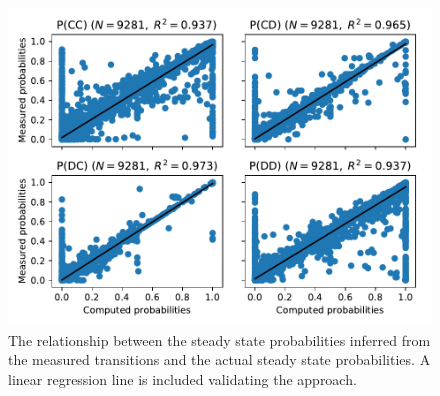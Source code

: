 \documentclass[a4paper]{article}
\begin{document}
\begin{figure}[!htbp]
    \centering
    \includegraphics[width=.8\textwidth]{./assets/img/computed_probabilities_vs_theoretic_probabilities/main.pdf}
    \caption{The
        relationship between the steady state probabilities inferred from the
        measured transitions and the actual steady state probabilities. A linear
        regression line is included validating the approach.}
    \label{fig:computed_probabilities_vs_theoretic_probabilities}
\end{figure}
\end{document}
